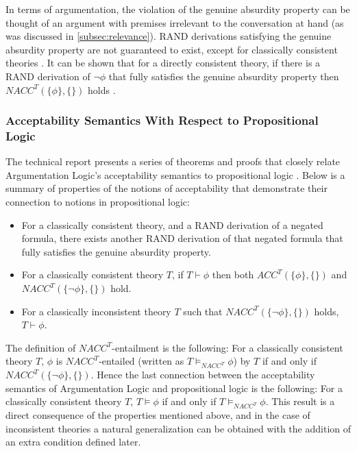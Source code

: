 \documentclass[11pt,twoside,a4paper]{report}
\begin{document}
In terms of argumentation, the violation of the genuine absurdity property can be thought of an argument with premises irrelevant to the conversation at hand (as was discussed in \autoref{subsec:relevance}). RAND derivations satisfying the genuine absurdity property are not guaranteed to exist, except for classically consistent theories \citep*[p. 9]{alpaper}. It can be shown that for a directly consistent theory, if there is a RAND derivation of $\neg\phi$ that fully satisfies the genuine absurdity property then $NACC^T(\{\phi\},\{\})$ holds \citep*[p. 19]{alpaper}.

\subsubsection{Acceptability Semantics With Respect to Propositional Logic}
The technical report presents a series of theorems and proofs that closely relate Argumentation Logic's acceptability semantics to propositional logic \citep*[pp. 10-11]{alpaper}. Below is a summary of properties of the notions of acceptability that demonstrate their connection to notions in propositional logic:
\begin{itemize}
\item
For a classically consistent theory, and a RAND derivation of a negated formula, there exists another RAND derivation of that negated formula that fully satisfies the genuine absurdity property.
\item
For a classically consistent theory $T$, if $T\vdash\phi$ then both $ACC^T(\{\phi\},\{\})$ and $NACC^T(\{\neg\phi\},\{\})$ hold.
\item
For a classically inconsistent theory $T$ such that $NACC^T(\{\neg\phi\},\{\})$ holds, $T\vdash\phi$.
\end{itemize}

The definition of $NACC^T$-entailment is the following: For a classically consistent theory $T$, $\phi$ is $NACC^T$-entailed (written as $T\models_{NACC^T}\phi$) by $T$ if and only if $NACC^T(\{\neg\phi\},\{\})$. Hence the last connection between the acceptability semantics of Argumentation Logic and propositional logic is the following: For a classically consistent theory $T$, $T\models\phi$ if and only if $T\models_{NACC^T}\phi$. 
This result is a direct consequence of the properties mentioned above, and in the case of inconsistent theories a natural generalization can be obtained with the addition of an extra condition defined later.
\end{document}
